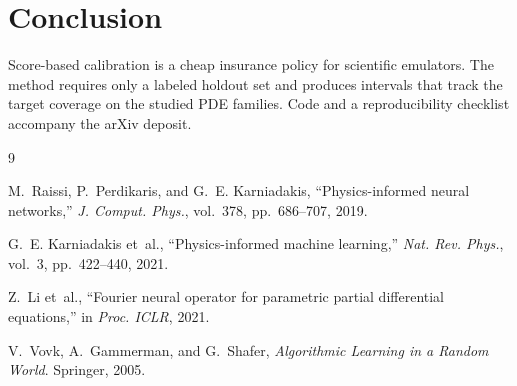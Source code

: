 \documentclass[11pt,a4paper]{article}
\begin{document}
\section{Conclusion}

Score-based calibration is a cheap insurance policy for scientific emulators. The method requires only a labeled holdout set and produces intervals that track the target coverage on the studied PDE families. Code and a reproducibility checklist accompany the arXiv deposit.

\begin{thebibliography}{9}

M.~Raissi, P.~Perdikaris, and G.~E. Karniadakis, ``Physics-informed neural networks,'' \textit{J. Comput. Phys.}, vol.~378, pp.~686--707, 2019.

G.~E. Karniadakis et~al., ``Physics-informed machine learning,'' \textit{Nat. Rev. Phys.}, vol.~3, pp.~422--440, 2021.

Z.~Li et~al., ``Fourier neural operator for parametric partial differential equations,'' in \textit{Proc. ICLR}, 2021.

V.~Vovk, A.~Gammerman, and G.~Shafer, \textit{Algorithmic Learning in a Random World}. Springer, 2005.

\end{thebibliography}
\end{document}

